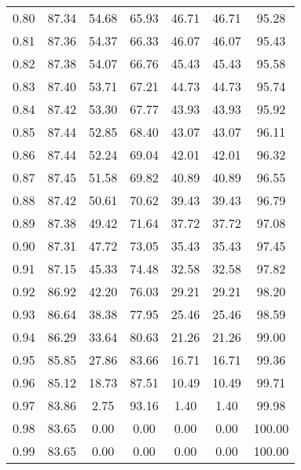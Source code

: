 \begin{tabular}{|c|c|c|c|c|c|c|}
      0.80 &     87.34 &     54.68 &      65.93 &   46.71 &      46.71 &         95.28 \\
      0.81 &     87.36 &     54.37 &      66.33 &   46.07 &      46.07 &         95.43 \\
      0.82 &     87.38 &     54.07 &      66.76 &   45.43 &      45.43 &         95.58 \\
      0.83 &     87.40 &     53.71 &      67.21 &   44.73 &      44.73 &         95.74 \\
      0.84 &     87.42 &     53.30 &      67.77 &   43.93 &      43.93 &         95.92 \\
      0.85 &     87.44 &     52.85 &      68.40 &   43.07 &      43.07 &         96.11 \\
      0.86 &     87.44 &     52.24 &      69.04 &   42.01 &      42.01 &         96.32 \\
      0.87 &     87.45 &     51.58 &      69.82 &   40.89 &      40.89 &         96.55 \\
      0.88 &     87.42 &     50.61 &      70.62 &   39.43 &      39.43 &         96.79 \\
      0.89 &     87.38 &     49.42 &      71.64 &   37.72 &      37.72 &         97.08 \\
      0.90 &     87.31 &     47.72 &      73.05 &   35.43 &      35.43 &         97.45 \\
      0.91 &     87.15 &     45.33 &      74.48 &   32.58 &      32.58 &         97.82 \\
      0.92 &     86.92 &     42.20 &      76.03 &   29.21 &      29.21 &         98.20 \\
      0.93 &     86.64 &     38.38 &      77.95 &   25.46 &      25.46 &         98.59 \\
      0.94 &     86.29 &     33.64 &      80.63 &   21.26 &      21.26 &         99.00 \\
      0.95 &     85.85 &     27.86 &      83.66 &   16.71 &      16.71 &         99.36 \\
      0.96 &     85.12 &     18.73 &      87.51 &   10.49 &      10.49 &         99.71 \\
      0.97 &     83.86 &      2.75 &      93.16 &    1.40 &       1.40 &         99.98 \\
      0.98 &     83.65 &      0.00 &       0.00 &    0.00 &       0.00 &        100.00 \\
      0.99 &     83.65 &      0.00 &       0.00 &    0.00 &       0.00 &        100.00 \\
\bottomrule
\end{tabular}
